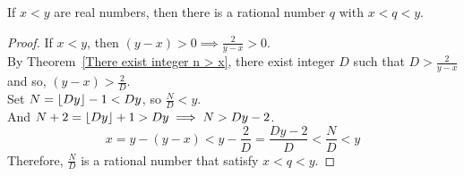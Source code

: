 \documentclass[a4paper]{article}
\begin{document}
\begin{nthm}
If $x < y$ are real numbers, then there is a rational number $q$ with $x < q < y$.
\end{nthm}
\begin{proof}
If $x < y$, then $(y - x) > 0 \implies \frac{2}{y - x} > 0$.\\
By Theorem~\ref{There exist integer n > x}, there exist integer $D$ such that $D > \frac{2}{y - x}$ and so, $(y - x) > \frac{2}{D}$.\\
Set $N = \left\lfloor Dy \right\rfloor - 1 < Dy$, so $\frac{N}{D} < y$.\\
And $N + 2 = \left\lfloor Dy \right\rfloor + 1 > Dy \implies N > Dy - 2$.\\
$$x = y - (y - x) < y - \frac{2}{D} = \frac{Dy - 2}{D} < \frac{N}{D} < y$$
Therefore, $\frac{N}{D}$ is a rational number that satisfy $x < q < y$.
\end{proof}
\end{document}
